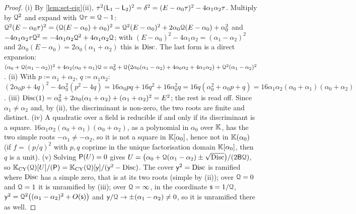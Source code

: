 \begin{proof}
(i) By \cref{lem:set-eig}(ii), $\tau^2(\mathsf{L}_1-\mathsf{L}_2)^2=\delta^2=(E-\alpha_0\tau)^2-4\alpha_1\alpha_2\tau$. Multiply by $\mathcal{Q}^2$ and expand with $\mathcal{Q}\tau=\mathcal{Q}-1$: $\mathcal{Q}^2(E-\alpha_0\tau)^2=(\mathcal{Q}(E-\alpha_0)+\alpha_0)^2=\mathcal{Q}^2(E-\alpha_0)^2+2\alpha_0\mathcal{Q}(E-\alpha_0)+\alpha_0^2$ and $-4\alpha_1\alpha_2\tau\mathcal{Q}^2=-4\alpha_1\alpha_2\mathcal{Q}^2+4\alpha_1\alpha_2\mathcal{Q}$; with $(E-\alpha_0)^2-4\alpha_1\alpha_2=(\alpha_1-\alpha_2)^2$ and $2\alpha_0(E-\alpha_0)=2\alpha_0(\alpha_1+\alpha_2)$ this is $\operatorname{Disc}$. The last form is a direct expansion: $(\alpha_0+\mathcal{Q}(\alpha_1-\alpha_2))^2+4\alpha_2(\alpha_0+\alpha_1)\mathcal{Q}=\alpha_0^2+\mathcal{Q}\big(2\alpha_0(\alpha_1-\alpha_2)+4\alpha_0\alpha_2+4\alpha_1\alpha_2\big)+\mathcal{Q}^2(\alpha_1-\alpha_2)^2$.
(ii) With $p\coloneqq\alpha_1+\alpha_2$, $q\coloneqq\alpha_1\alpha_2$: $(2\alpha_0p+4q)^2-4\alpha_0^2(p^2-4q)=16\alpha_0pq+16q^2+16\alpha_0^2q=16q(\alpha_0^2+\alpha_0p+q)=16\alpha_1\alpha_2(\alpha_0+\alpha_1)(\alpha_0+\alpha_2)$.
(iii) $\operatorname{Disc}(1)=\alpha_0^2+2\alpha_0(\alpha_1+\alpha_2)+(\alpha_1+\alpha_2)^2=E^2$; the rest is read off. Since $\alpha_1\neq\alpha_2$ and, by (ii), the discriminant is non-zero, the two roots are finite and distinct.
(iv) A quadratic over a field is reducible if and only if its discriminant is a square. $16\alpha_1\alpha_2(\alpha_0+\alpha_1)(\alpha_0+\alpha_2)$, as a polynomial in $\alpha_0$ over $\mathbb{K}$, has the two simple roots $-\alpha_1\neq-\alpha_2$, so it is not a square in $\mathbb{K}[\alpha_0]$, hence not in $\mathbb{K}(\alpha_0)$ (if $f=(p/q)^2$ with $p,q$ coprime in the unique factorisation domain $\mathbb{K}[\alpha_0]$, then $q$ is a unit).
(v) Solving $\mathsf{P}(U)=0$ gives $U=\big(\alpha_0+\mathcal{Q}(\alpha_1-\alpha_2)\pm\sqrt{\operatorname{Disc}}\big)/(2\mathsf{B}\mathcal{Q})$, so $\mathbb{K}_{\mathrm{CY}}(\mathcal{Q})[U]/(\mathsf{P})=\mathbb{K}_{\mathrm{CY}}(\mathcal{Q})[\mathsf{y}]/(\mathsf{y}^2-\operatorname{Disc})$. The cover $\mathsf{y}^2=\operatorname{Disc}$ is ramified where $\operatorname{Disc}$ has a simple zero, that is at its two roots (simple by (ii)); over $\mathcal{Q}=0$ and $\mathcal{Q}=1$ it is unramified by (iii); over $\mathcal{Q}=\infty$, in the coordinate $\mathsf{s}=1/\mathcal{Q}$, $\mathsf{y}^2=\mathcal{Q}^2\big((\alpha_1-\alpha_2)^2+O(\mathsf{s})\big)$ and $\mathsf{y}/\mathcal{Q}\to\pm(\alpha_1-\alpha_2)\neq0$, so it is unramified there as well.
\end{proof}

